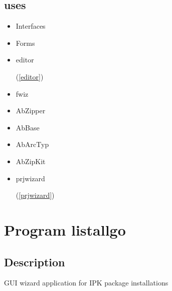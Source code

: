 \documentclass{report}
\begin{document}
\section{uses}
\begin{itemize}
\item \begin{ttfamily}Interfaces\end{ttfamily}\item \begin{ttfamily}Forms\end{ttfamily}\item \begin{ttfamily}editor\end{ttfamily}(\ref{editor})\item \begin{ttfamily}fwiz\end{ttfamily}\item \begin{ttfamily}AbZipper\end{ttfamily}\item \begin{ttfamily}AbBase\end{ttfamily}\item \begin{ttfamily}AbArcTyp\end{ttfamily}\item \begin{ttfamily}AbZipKit\end{ttfamily}\item \begin{ttfamily}prjwizard\end{ttfamily}(\ref{prjwizard})\end{itemize}
\chapter{Program listallgo}
\label{listallgo}
\section{Description}
GUI wizard application for IPK package installations
\end{document}
